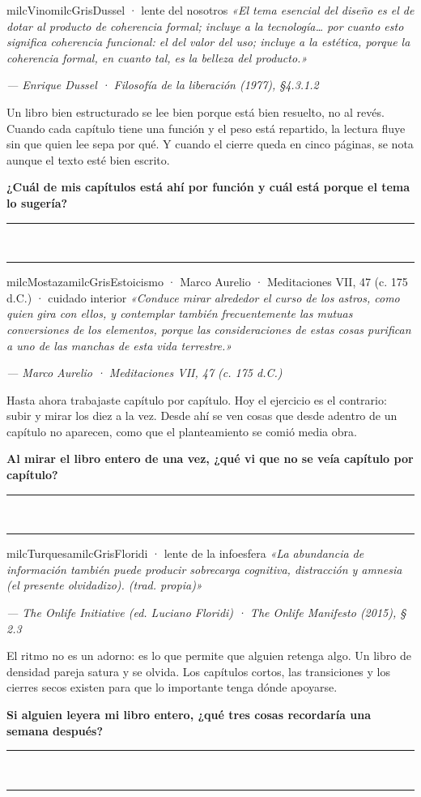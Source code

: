 \documentclass[11pt,letterpaper]{article}
\newcommand{\linead}[1]{\noindent\color{milcLinea}\rule{#1}{0.5pt}\color{milcNegro}}
\begin{document}
\begin{softbox}{milcVino}{milcGris}{Dussel · lente del nosotros}
\textit{«El tema esencial del diseño es el de dotar al producto de coherencia formal; incluye a la tecnología… por cuanto esto significa coherencia funcional: el del valor del uso; incluye a la estética, porque la coherencia formal, en cuanto tal, es la belleza del producto.»}

{\footnotesize\itshape\color{milcNegro!70}--- Enrique Dussel · Filosofía de la liberación (1977), §4.3.1.2}

Un libro bien estructurado se lee bien porque está bien resuelto, no al revés. Cuando cada capítulo tiene una función y el peso está repartido, la lectura fluye sin que quien lee sepa por qué. Y cuando el cierre queda en cinco páginas, se nota aunque el texto esté bien escrito.

\textbf{¿Cuál de mis capítulos está ahí por función y cuál está porque el tema lo sugería?}
\end{softbox}
\linead{\linewidth}\\[1mm]
\linead{\linewidth}

\begin{softbox}{milcMostaza}{milcGris}{Estoicismo · Marco Aurelio · Meditaciones VII, 47 (c. 175 d.C.) · cuidado interior}
\textit{«Conduce mirar alrededor el curso de los astros, como quien gira con ellos, y contemplar también frecuentemente las mutuas conversiones de los elementos, porque las consideraciones de estas cosas purifican a uno de las manchas de esta vida terrestre.»}

{\footnotesize\itshape\color{milcNegro!70}--- Marco Aurelio · Meditaciones VII, 47 (c. 175 d.C.)}

Hasta ahora trabajaste capítulo por capítulo. Hoy el ejercicio es el contrario: subir y mirar los diez a la vez. Desde ahí se ven cosas que desde adentro de un capítulo no aparecen, como que el planteamiento se comió media obra.

\textbf{Al mirar el libro entero de una vez, ¿qué vi que no se veía capítulo por capítulo?}
\end{softbox}
\linead{\linewidth}\\[1mm]
\linead{\linewidth}

\begin{softbox}{milcTurquesa}{milcGris}{Floridi · lente de la infoesfera}
\textit{«La abundancia de información también puede producir sobrecarga cognitiva, distracción y amnesia (el presente olvidadizo). (trad. propia)»}

{\footnotesize\itshape\color{milcNegro!70}--- The Onlife Initiative (ed. Luciano Floridi) · The Onlife Manifesto (2015), § 2.3}

El ritmo no es un adorno: es lo que permite que alguien retenga algo. Un libro de densidad pareja satura y se olvida. Los capítulos cortos, las transiciones y los cierres secos existen para que lo importante tenga dónde apoyarse.

\textbf{Si alguien leyera mi libro entero, ¿qué tres cosas recordaría una semana después?}
\end{softbox}
\linead{\linewidth}\\[1mm]
\linead{\linewidth}
\end{document}
